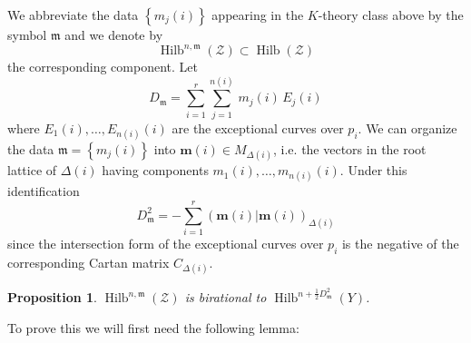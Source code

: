 \documentclass{amsart}
\newtheorem{proposition}[theorem]{Proposition}
\theoremstyle{definition}
\newcommand{\half}{\frac{1}{2}}
\newcommand{\mdata}{\mathfrak{m}}
\newcommand{\Zcal}{\mathcal{Z}}
\newcommand{\mvec}{\bm{m}}
\newcommand{\Hilb}{\operatorname{Hilb}}
\begin{document}
We abbreviate the data $\left\{m_{j}(i) \right\}$ appearing in the
$K$-theory class above by the symbol $\mdata$ and we denote by
\[
\Hilb^{n,\mdata}(\Zcal ) \subset \Hilb (\Zcal )
\]
the corresponding component. Let
\[
D_{\mdata} = \sum_{i=1}^{r} \sum_{j=1}^{n(i)} \, m_{j}(i)\, E_{j}(i)
\]
where
$E_{1}(i),\dotsc ,E_{n(i)}(i)$ are
the exceptional curves over $p_{i}$. We can organize the data $\mdata = \left\{m_{j}(i) \right\}$ into
$\mvec (i)\in M_{\Delta (i)}$, i.e.  the vectors in the root lattice
of $\Delta (i)$ having components $ m_{1}(i),\dotsc
,m_{n(i)}(i)$. Under this identification
\[
D_{\mdata}^{2} = -\sum_{i=1}^{r} \left(\mvec (i)|\mvec (i)
\right)_{\Delta (i)} 
\]
since the intersection form of the exceptional curves over $p_{i}$ is
the negative of the corresponding Cartan matrix $C_{\Delta (i)}$. 


\begin{proposition}\label{prop: Hilb(Z) is birational to Hilb(Y)}
	$\Hilb^{n,\mdata}(\Zcal)$ is birational to $\Hilb^{n+\half
		D_{\mdata}^{2}}(Y)$. 
\end{proposition}

To prove this we will first need the following lemma:
\end{document}
